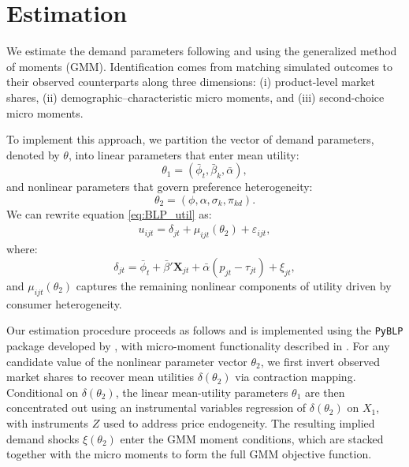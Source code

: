 \documentclass[11pt]{article}
\begin{document}

\section{Estimation}\label{sec:sec_estm}
We estimate the demand parameters following \cite{berry_differentiated_2004} and \cite{petrin_quantifying_2002} using the generalized method of moments (GMM). Identification comes from matching simulated outcomes to their observed counterparts along three dimensions: (i) product-level market shares, (ii) demographic–characteristic micro moments, and (iii) second-choice micro moments.

To implement this approach, we partition the vector of demand parameters, denoted by \(\theta\), into linear parameters that enter mean utility:
\[ \theta_1 = (\bar{\phi}_t, \bar{\beta}_k, \bar{\alpha}), \]
and nonlinear parameters that govern preference heterogeneity:
\[ \theta_2 = (\phi, \alpha, \sigma_k, \pi_{kd}). \]
We can rewrite equation \eqref{eq:BLP_util} as:
\begin{align}\label{eq:u_with_delta}
    u_{ijt} = \delta_{jt} + \mu_{ijt}(\theta_2) + \varepsilon_{ijt},
\end{align}
where:
\[ \delta_{jt} = \bar{\phi}_t + \bar{\beta}'\mathbf{X}_{jt} + \bar{\alpha}(p_{jt} - \tau_{jt}) + \xi_{jt}, \]
and \(\mu_{ijt}(\theta_2)\) captures the remaining nonlinear components of utility driven by consumer heterogeneity.

Our estimation procedure proceeds as follows and is implemented using the \texttt{PyBLP} package developed by \cite{conlon_best_2020}, with micro-moment functionality described in \cite{conlon_incorporating_2025}. For any candidate value of the nonlinear parameter vector \(\theta_2\), we first invert observed market shares to recover mean utilities \(\delta(\theta_2)\) via contraction mapping. Conditional on \(\delta(\theta_2)\), the linear mean-utility parameters \(\theta_1\) are then concentrated out using an instrumental variables regression of \(\delta(\theta_2)\) on \(X_1\), with instruments \(Z\) used to address price endogeneity. The resulting implied demand shocks \(\xi(\theta_2)\) enter the GMM moment conditions, which are stacked together with the micro moments to form the full GMM objective function.
\end{document}
